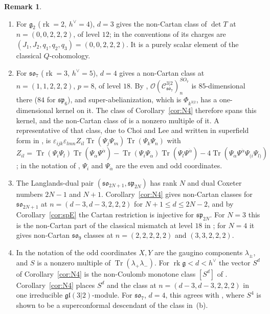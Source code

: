 \documentclass[11pt]{article}
\theoremstyle{definition}
\newtheorem{remark}[theorem]{Remark}
\newcommand{\g}{\mathfrak g}
\newcommand{\Cs}{\mathcal C}
\newcommand{\Oo}{\mathcal O}
\newcommand{\rk}{\operatorname{rk}}
\newcommand{\hv}{h^\vee}
\begin{document}
\begin{remark}\label{rem:N4}
\begin{enumerate}[label=(\alph*),leftmargin=*]
\item For $\g_2$ ($\rk=2$, $\hv=4$), $d=3$ gives the non-Cartan class of $\det T$ at $n=(0,0,2,2,2)$, of level $12$; in the conventions of \cite[\S5.2]{Ch26} its charges are $(J_1,J_2,q_1,q_2,q_3)=(0,0,2,2,2)$. It is a purely scalar element of the classical $Q$-cohomology.
\item For $\mathfrak{so}_7$ ($\rk=3$, $\hv=5$), $d=4$ gives a non-Cartan class at $n=(1,1,2,2,2)$, $p=8$, of level $18$. By \cite[\S3, Table~1 and Discussions]{CL25}, $\Oo(\Cs^{3|2}_{\mathfrak{so}_7})^{SO_7}_n$ is $85$-dimensional there ($84$ for $\mathfrak{sp}_6$), and super-abelianization, which is $\Phi_{k^{3|2}}$, has a one-dimensional kernel on it. The class of Corollary~\ref{cor:N4} therefore spans this kernel, and the non-Cartan class of \cite[Thm.~1]{Ch26} is a nonzero multiple of it. A representative of that class, due to Choi and Lee \cite{CE25} and written in superfield form in \cite[eq.~(16)]{Ch26}, is $\varepsilon_{ijk}\varepsilon_{lmn}Z_{il}\operatorname{Tr}(\Psi_j\Psi_m)\operatorname{Tr}(\Psi_k\Psi_n)$ with $Z_{il}=\operatorname{Tr}(\Psi_i\Psi_l)\operatorname{Tr}(\Psi_{\dot\alpha}\Psi^{\dot\alpha})-\operatorname{Tr}(\Psi_i\Psi_{\dot\alpha})\operatorname{Tr}(\Psi_l\Psi^{\dot\alpha})-4\operatorname{Tr}(\Psi_{\dot\alpha}\Psi^{\dot\alpha}\Psi_{(i}\Psi_{l)})$; in the notation of \cite{Ch26}, $\Psi_i$ and $\Psi_{\dot\alpha}$ are the even and odd coordinates.
\item The Langlands-dual pair $(\mathfrak{so}_{2N+1},\mathfrak{sp}_{2N})$ has rank $N$ and dual Coxeter numbers $2N-1$ and $N+1$. Corollary~\ref{cor:N4} gives non-Cartan classes for $\mathfrak{so}_{2N+1}$ at $n=(d-3,d-3,2,2,2)$ for $N+1\le d\le2N-2$, and by Corollary~\ref{cor:spE} the Cartan restriction is injective for $\mathfrak{sp}_{2N}$. For $N=3$ this is the non-Cartan part of the classical mismatch at level $18$ in \cite{CL25}; for $N=4$ it gives non-Cartan $\mathfrak{so}_9$ classes at $n=(2,2,2,2,2)$ and $(3,3,2,2,2)$.
\item In the notation of \cite[\S2]{KvLM26} the odd coordinates $X,Y$ are the gaugino components $\lambda_\pm$, and $S$ is a nonzero multiple of $\operatorname{Tr}(\lambda_+\lambda_-)$. For $\rk\g<d<\hv$ the vector $S^d$ of Corollary~\ref{cor:N4} is the non-Coulomb monotone class $[S^d]$ of \cite[eq.~(1)]{KvLM26}. Corollary~\ref{cor:N4} places $S^d$ and the class at $n=(d-3,d-3,2,2,2)$ in one irreducible $\mathfrak{gl}(3|2)$-module. For $\mathfrak{so}_7$, $d=4$, this agrees with \cite[\S5, App.~D]{KvLM26}, where $S^4$ is shown to be a superconformal descendant of the class in~(b).
\end{enumerate}
\end{remark}
\end{document}
